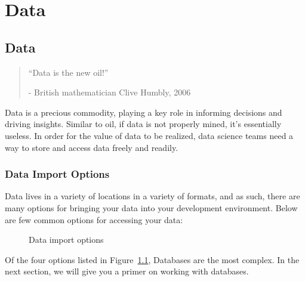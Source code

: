 \documentclass[
  letterpaper,
  DIV=11,
  numbers=noendperiod]{scrreprt}
\begin{document}
\part{Data}

\chapter{Data}\label{data-1}

\begin{quote}
{``Data is the new oil!''}

- British mathematician Clive Humbly, 2006
\end{quote}

Data is a precious commodity, playing a key role in informing decisions
and driving insights. Similar to oil, if data is not properly mined,
it's essentially useless. In order for the value of data to be realized,
data science teams need a way to store and access data freely and
readily.

\section{Data Import Options}\label{data-import-options}

Data lives in a variety of locations in a variety of formats, and as
such, there are many options for bringing your data into your
development environment. Below are few common options for accessing your
data:

\begin{figure}


\caption{\label{fig-data-import-options}Data import options}

\end{figure}%

Of the four options listed in Figure~\ref{fig-data-import-options},
Databases are the most complex. In the next section, we will give you a
primer on working with databases.
\end{document}
